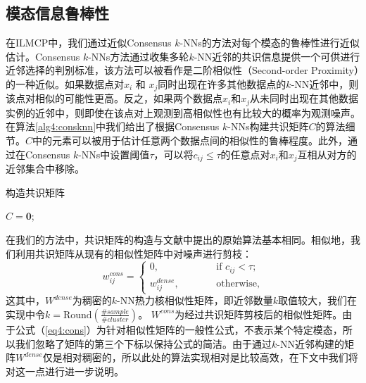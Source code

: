 \subsection{模态信息鲁棒性}
在ILMCP中，我们通过近似Consensus $k$-NNs\cite{premachandran2013consensus}的方法对每个模态的鲁棒性进行近似估计。Consensus $k$-NNs方法通过收集多轮$k$-NN近邻的共识信息提供一个可供进行近邻选择的判别标准，该方法可以被看作是二阶相似性（Second-order Proximity）\cite{tang2015line,wang2016structural}的一种近似。如果数据点对$x_i$ 和 $x_j$同时出现在许多其他数据点的$k$-NN近邻中，则该点对相似的可能性更高。反之，如果两个数据点$x_i$和$x_j$从未同时出现在其他数据实例的近邻中，则即使在该点对上观测到高相似性也有比较大的概率为观测噪声。
在算法\ref{alg4:consknn}中我们给出了根据Consensus $k$-NNs构建共识矩阵$C$的算法细节。$C$中的元素可以被用于估计任意两个数据点间的相似性的鲁棒程度。此外，通过在Consensus $k$-NNs中设置阈值$\tau$，可以将${c}_{ij}\le\tau$的任意点对$x_i$和$x_j$互相从对方的近邻集合中移除。
\begin{algorithm}[tb]
            \caption{构造共识矩阵}
            \label{alg4:consknn}
            ${C} = \mathbf{0}$;
            \For {$i = 1:N$}{
                \ForAll {$x_j, x_k$满足$x_j, x_k \in \mathcal{N}_k(x_i)$}{
                    ${c}_{j,k} = {c}_{j,k}+1$\;
                    ${c}_{k,j} = {c}_{k,j}+1$\;
                }
            }
\end{algorithm}

在我们的方法中，共识矩阵的构造与文献\parencite{premachandran2013consensus}中提出的原始算法基本相同。相似地，我们利用共识矩阵从现有的相似性矩阵中对噪声进行剪枝：
\begin{equation}
{w}^{cons}_{ij} = 
\begin{cases}
0,\quad\qquad\qquad&\text{if }{c}_{ij}<\tau;\\ {w}^{dense}_{ij},&\text{otherwise,}
\end{cases}
\label{eq4:cons}
\end{equation}
这其中，${W}^{dense}$为稠密的$k$-NN热力核相似性矩阵，即近邻数量$k$取值较大，我们在实现中令$k = \mathrm{Round}( \frac{\#sample}{\#cluster})$。 ${W}^{cons}$为经过共识矩阵剪枝后的相似性矩阵。由于公式（\ref{eq4:cons}）为针对相似性矩阵的一般性公式，不表示某个特定模态，所以我们忽略了矩阵的第三个下标以保持公式的简洁。由于通过$k$-NN近邻构建的矩阵${W}^{dense}$仅是相对稠密的，所以此处的算法实现相对是比较高效，在下文中我们将对这一点进行进一步说明。

